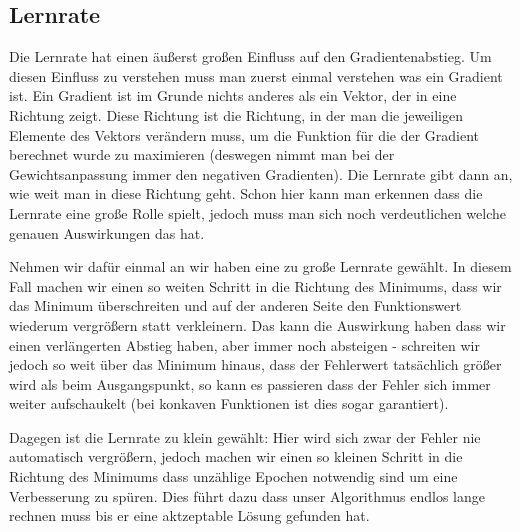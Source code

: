 \documentclass[a4paper]{article}
\begin{document}
\subsection{Lernrate}
Die Lernrate hat einen äußerst großen Einfluss auf den Gradientenabstieg. Um diesen Einfluss zu verstehen muss man zuerst einmal verstehen was ein Gradient ist. Ein Gradient ist im Grunde nichts anderes als ein Vektor, der in eine Richtung zeigt. Diese Richtung ist die Richtung, in der man die jeweiligen Elemente des Vektors verändern muss, um die Funktion für die der Gradient berechnet wurde zu maximieren (deswegen nimmt man bei der Gewichtsanpassung immer den negativen Gradienten). Die Lernrate gibt dann an, wie weit man in diese Richtung geht. Schon hier kann man erkennen dass die Lernrate eine große Rolle spielt, jedoch muss man sich noch verdeutlichen welche genauen Auswirkungen das hat.

Nehmen wir dafür einmal an wir haben eine zu große Lernrate gewählt. In diesem Fall machen wir einen so weiten Schritt in die Richtung des Minimums, dass wir das Minimum überschreiten und auf der anderen Seite den Funktionswert wiederum vergrößern statt verkleinern. Das kann die Auswirkung haben dass wir einen verlängerten Abstieg haben, aber immer noch absteigen - schreiten wir jedoch so weit über das Minimum hinaus, dass der Fehlerwert tatsächlich größer wird als beim Ausgangspunkt, so kann es passieren dass der Fehler sich immer weiter aufschaukelt (bei konkaven Funktionen ist dies sogar garantiert).

Dagegen ist die Lernrate zu klein gewählt: Hier wird sich zwar der Fehler nie automatisch vergrößern, jedoch machen wir einen so kleinen Schritt in die Richtung des Minimums dass unzählige Epochen notwendig sind um eine Verbesserung zu spüren. Dies führt dazu dass unser Algorithmus endlos lange rechnen muss bis er eine aktzeptable Lösung gefunden hat.
\end{document}
